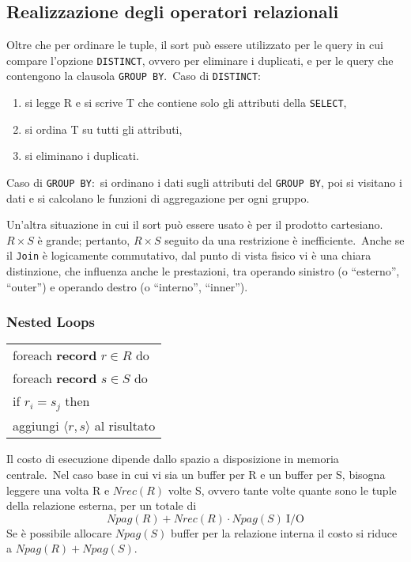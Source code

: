 \subsection{Realizzazione degli operatori relazionali}

Oltre che per ordinare le tuple, il sort può essere utilizzato per le query in cui compare l'opzione \texttt{DISTINCT}, ovvero per eliminare i duplicati, e per le query che contengono la clausola \texttt{GROUP BY}.\
Caso di \texttt{DISTINCT}:
\begin{enumerate}
	\item si legge R e si scrive T che contiene solo gli attributi della \texttt{SELECT},
	\item si ordina T su tutti gli attributi,
	\item si eliminano i duplicati.
\end{enumerate}

\noindent Caso di \texttt{GROUP BY}:\ si ordinano i dati sugli attributi del \texttt{GROUP BY}, poi si visitano i dati e si calcolano le funzioni di aggregazione per ogni gruppo.

Un'altra situazione in cui il sort può essere usato è per il prodotto cartesiano.\ $R\times S$ è grande; pertanto, $R\times S$ seguito da una restrizione è inefficiente.\
Anche se il \texttt{Join} è logicamente commutativo, dal punto di vista fisico vi è una chiara distinzione, che influenza anche le prestazioni, tra operando sinistro (o ``esterno'', ``outer'') e operando destro (o ``interno'', ``inner'').

\subsubsection{Nested Loops}

\begin{table}[H]
	\centering
	\begin{tabular}{|l|}
		\hline
		foreach \textbf{record} $r \in R$ do                     \\
		\quad foreach \textbf{record} $s \in S$ do               \\
		\qquad if $r_i = s_j$ then                               \\
		\qquad\quad aggiungi $\langle r, s \rangle$ al risultato \\\hline
	\end{tabular}
\end{table}

\noindent Il costo di esecuzione dipende dallo spazio a disposizione in memoria centrale.\
Nel caso base in cui vi sia un buffer per R e un buffer per S, bisogna leggere una volta R e $\mathit{Nrec}(R)$ volte S, ovvero tante volte quante sono le tuple della relazione esterna, per un totale di \[Npag(R) + Nrec(R) \cdot Npag(S)\ \mathrm{I/O}\]
Se è possibile allocare $Npag(S)$ buffer per la relazione interna il costo si riduce a $Npag(R) + Npag(S)$.

